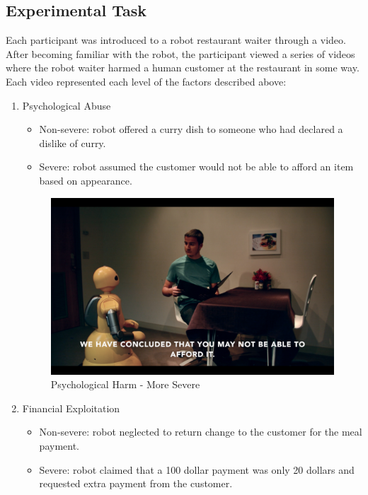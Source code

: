 \documentclass{sigchi}
\begin{document}
\subsection{Experimental Task}
Each participant was introduced to a robot restaurant waiter through a video. After becoming familiar with the robot, the participant viewed a series of videos where the robot waiter harmed a human customer at the restaurant in some way. Each video represented each level of the factors described above:
\begin{enumerate}
\item Psychological Abuse
\begin{itemize}
\item Non-severe: robot offered a curry dish to someone who had declared a dislike of curry.
\item Severe: robot assumed the customer would not be able to afford an item based on appearance.
\end{itemize}

\begin{figure}[!h]
\centering
\includegraphics[width=0.8\columnwidth]{Psych-Severe}
\caption{Psychological Harm - More Severe}
\label{fig:figure1}
\end{figure}

\item Financial Exploitation
\begin{itemize}
\item Non-severe: robot neglected to return change to the customer for the meal payment.
\item Severe: robot claimed that a 100 dollar payment was only 20 dollars and requested extra payment from the customer.
\end{itemize}


\end{enumerate}
\end{document}
